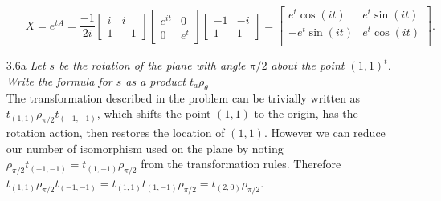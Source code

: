 \documentclass[12pt, letterpaper]{article}
\begin{document}
\begin{enumerate}
\begin{enumerate}
		$$
		X = e^{tA} = \frac{-1}{2i}  \begin{bmatrix} i & i\\1 & -1\end{bmatrix}\begin{bmatrix} e^{it}& 0\\ 0 & e^t\end{bmatrix}\begin{bmatrix}
		-1 & -i\\ 1&1
		\end{bmatrix} = \begin{bmatrix}
		 e^t \cos (i t) & e^t \sin (i t) \\
 -e^t \sin (i t) & e^t \cos (i t) \\
		\end{bmatrix}.
		$$
	\end{enumerate}
	\item[3.6a] \textit{Let $s$ be the rotation of the plane with angle $\pi/2$ about the point $(1, 1)^t$. Write the
formula for $s$ as a product $t_a \rho_\theta$}\\
	The transformation described in the problem can be trivially written as
	$t_{(1,1)}\rho_{\pi/2}t_{(-1,-1)}$, which shifts the point $(1,1)$ to the origin, has the rotation action, then restores the location of $(1,1)$. 
	However we can reduce our number of isomorphism used on the plane by noting $\rho_{\pi/2} t_{(-1,-1)} = t_{(1,-1)}\rho_{\pi/2}$ 	from the transformation rules.  Therefore $t_{(1,1)}\rho_{\pi/2}t_{(-1,-1)} = 
	t_{(1,1)} t_{(1,-1)} \rho_{\pi/2} = t_{(2,0)}\rho_{\pi/2}$.  
\end{enumerate}
\end{document}

